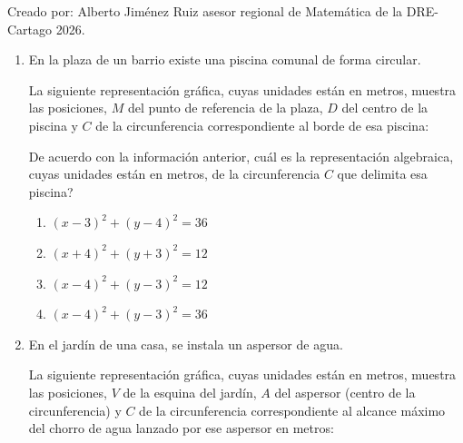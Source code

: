 \documentclass[11pt]{article}
\newcommand{\opcion}[2]{\item $#2$}
\newcommand{\rotuloxeste}{\mbox{\textit{x} (este)}}
\newcommand{\rotuloynorte}{\mbox{\textit{y} (norte)}}
\begin{document}
\vspace{8pt}
\noindent Creado por: Alberto Jim\'enez Ruiz asesor regional de Matem\'atica de la DRE-Cartago 2026.

\newpage

\begin{enumerate}[label=\textbf{\arabic*.}, itemsep=2.5cm]

\Needspace{0.92\textheight}
\item
En la plaza de un barrio existe una piscina comunal de forma circular.

La siguiente representaci\'on gr\'afica, cuyas unidades est\'an en metros, muestra las posiciones, $M$ del punto de referencia de la plaza, $D$ del centro de la piscina y $C$ de la circunferencia correspondiente al borde de esa piscina:

\begin{center}
\end{center}

De acuerdo con la informaci\'on anterior, \textquestiondown cu\'al es la representaci\'on algebraica, cuyas unidades est\'an en metros, de la circunferencia $C$ que delimita esa piscina?

\begin{enumerate}[label=\Alph*)]
  \opcion{A}{(x-3)^2+(y-4)^2=36}
  \opcion{B}{(x+4)^2+(y+3)^2=12}
  \opcion{C}{(x-4)^2+(y-3)^2=12}
  \opcion{D}{(x-4)^2+(y-3)^2=36}
\end{enumerate}

\Needspace{0.90\textheight}
\item
En el jard\'in de una casa, se instala un aspersor de agua.

La siguiente representaci\'on gr\'afica, cuyas unidades est\'an en metros, muestra las posiciones, $V$ de la esquina del jard\'in, $A$ del aspersor (centro de la circunferencia) y $C$ de la circunferencia correspondiente al alcance m\'aximo del chorro de agua lanzado por ese aspersor en metros:


\end{enumerate}
\end{document}
